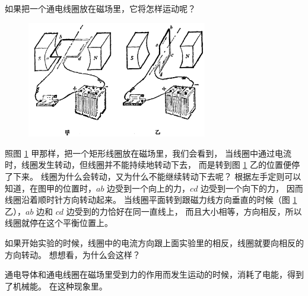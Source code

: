 如果把一个通电线圈放在磁场里，它将怎样运动呢？

\begin{figure}[htbp]
    \centering
    \includegraphics[width=0.7\textwidth]{../pic/czwl2-ch10-41}
    \caption{}\label{fig:10-41}
\end{figure}

照图 \ref{fig:10-41} 甲那样，把一个矩形线圈放在磁场里，我们会看到，
当线圈中通过电流时，线圈发生转动，但线圈并不能持续地转动下去，
而是转到图 \ref{fig:10-41} 乙的位置便停了下来。
线圈为什么会转动，又为什么不能继续转动下去呢？
根据左手定则可以知道，在图甲的位置时，$ab$ 边受到一个向上的力，$cd$ 边受到一个向下的力，
因而线圈沿着顺时针方向转动起来。
当线圈平面转到跟磁力线方向垂直的时候（图 \ref{fig:10-41} 乙），$ab$ 边和 $cd$ 边受到的力恰好在同一直线上，
而且大小相等，方向相反，所以线圈就停在这个平衡位置上。


如果开始实验的时候，线圈中的电流方向跟上面实验里的相反，线圈就要向相反的方向转动。
想想看，为什么会这样？

通电导体和通电线圈在磁场里受到力的作用而发生运动的时候，消耗了电能，得到了机械能。
在这种现象里。

